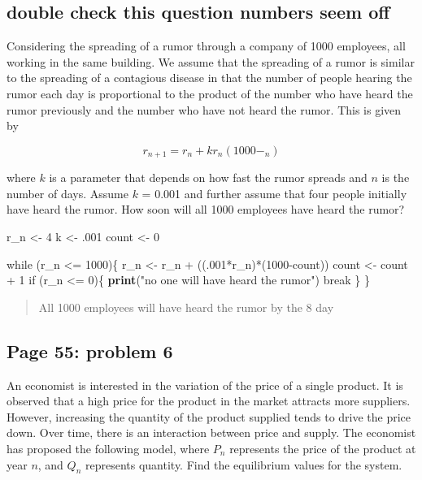 \documentclass[]{article}
\newenvironment{Shaded}{\begin{snugshade}}{\end{snugshade}}
\newcommand{\KeywordTok}[1]{\textcolor[rgb]{0.13,0.29,0.53}{\textbf{{#1}}}}
\newcommand{\DecValTok}[1]{\textcolor[rgb]{0.00,0.00,0.81}{{#1}}}
\newcommand{\StringTok}[1]{\textcolor[rgb]{0.31,0.60,0.02}{{#1}}}
\newcommand{\NormalTok}[1]{{#1}}
\begin{document}
\subsection{double check this question numbers seem
off}\label{double-check-this-question-numbers-seem-off}

Considering the spreading of a rumor through a company of 1000
employees, all working in the same building. We assume that the
spreading of a rumor is similar to the spreading of a contagious disease
in that the number of people hearing the rumor each day is proportional
to the product of the number who have heard the rumor previously and the
number who have not heard the rumor. This is given by

\[r_{n+1} = r_n + kr_n(1000- _n)\]

where \(k\) is a parameter that depends on how fast the rumor spreads
and \(n\) is the number of days. Assume \(k\) = 0.001 and further assume
that four people initially have heard the rumor. How soon will all 1000
employees have heard the rumor?

\begin{Shaded}
\begin{Highlighting}[]
\NormalTok{r_n <-}\StringTok{ }\DecValTok{4}
\NormalTok{k <-}\StringTok{ }\NormalTok{.}\DecValTok{001}
\NormalTok{count <-}\StringTok{ }\DecValTok{0}

\NormalTok{while (r_n <=}\StringTok{ }\DecValTok{1000}\NormalTok{)\{}
\NormalTok{r_n <-}\StringTok{ }\NormalTok{r_n +}\StringTok{ }\NormalTok{((.}\DecValTok{001}\NormalTok{*r_n)*(}\DecValTok{1000}\NormalTok{-count))}
\NormalTok{count <-}\StringTok{ }\NormalTok{count +}\StringTok{ }\DecValTok{1}
\NormalTok{if (r_n <=}\StringTok{ }\DecValTok{0}\NormalTok{)\{}
  \KeywordTok{print}\NormalTok{(}\StringTok{"no one will have heard the rumor"}\NormalTok{)}
  \NormalTok{break}
 \NormalTok{\}}
\NormalTok{\}}
\end{Highlighting}
\end{Shaded}

\begin{quote}
All 1000 employees will have heard the rumor by the 8 day
\end{quote}

\subsection{Page 55: problem 6}\label{page-55-problem-6}

An economist is interested in the variation of the price of a single
product. It is observed that a high price for the product in the market
attracts more suppliers. However, increasing the quantity of the product
supplied tends to drive the price down. Over time, there is an
interaction between price and supply. The economist has proposed the
following model, where \(P_n\) represents the price of the product at
year \(n\), and \(Q_n\) represents quantity. Find the equilibrium values
for the system.
\end{document}

